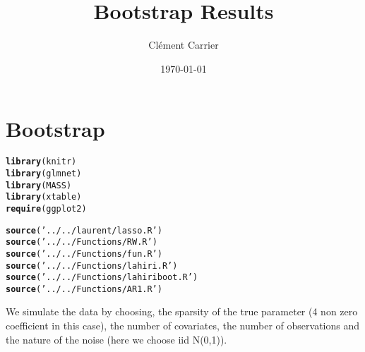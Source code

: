 \documentclass[11pt,oneside, a4paper]{amsart}\usepackage[]{graphicx}\usepackage[]{color}
\makeatletter
\newcommand{\hlstr}[1]{\textcolor[rgb]{0.192,0.494,0.8}{#1}}%
\newcommand{\hlstd}[1]{\textcolor[rgb]{0.345,0.345,0.345}{#1}}%
\newcommand{\hlkwd}[1]{\textcolor[rgb]{0.737,0.353,0.396}{\textbf{#1}}}%
\newenvironment{kframe}{%
 \def\at@end@of@kframe{}%
 \ifinner\ifhmode%
  \def\at@end@of@kframe{\end{minipage}}%
  \begin{minipage}{\columnwidth}%
 \fi\fi%
 \def\FrameCommand##1{\hskip\@totalleftmargin \hskip-\fboxsep
 \colorbox{shadecolor}{##1}\hskip-\fboxsep
     \hskip-\linewidth \hskip-\@totalleftmargin \hskip\columnwidth}%
 \MakeFramed {\advance\hsize-\width
   \@totalleftmargin\z@ \linewidth\hsize
   \@setminipage}}%
 {\par\unskip\endMakeFramed%
 \at@end@of@kframe}
\newenvironment{knitrout}{}{} %
\makeatother
\begin{document}
  
\title{Bootstrap Results}   
\author{Clément Carrier}
\date{\today}
\maketitle


\section*{Bootstrap}


\begin{knitrout}
\color{fgcolor}\begin{kframe}
\begin{alltt}
\hlkwd{library}\hlstd{(knitr)}
\hlkwd{library}\hlstd{(glmnet)}
\hlkwd{library}\hlstd{(MASS)}
\hlkwd{library}\hlstd{(xtable)}
\hlkwd{require}\hlstd{(ggplot2)}
\end{alltt}
\end{kframe}
\end{knitrout}




\begin{knitrout}
\color{fgcolor}\begin{kframe}
\begin{alltt}
\hlkwd{source}\hlstd{(}\hlstr{'../../laurent/lasso.R'}\hlstd{)}
\hlkwd{source}\hlstd{(}\hlstr{'../../Functions/RW.R'}\hlstd{)}
\hlkwd{source}\hlstd{(}\hlstr{'../../Functions/fun.R'}\hlstd{)}
\hlkwd{source}\hlstd{(}\hlstr{'../../Functions/lahiri.R'}\hlstd{)}
\hlkwd{source}\hlstd{(}\hlstr{'../../Functions/lahiriboot.R'}\hlstd{)}
\hlkwd{source}\hlstd{(}\hlstr{'../../Functions/AR1.R'}\hlstd{)}
\end{alltt}
\end{kframe}
\end{knitrout}


We simulate the data by choosing, the sparsity of the true parameter (4 non zero coefficient in this case), the number of covariates, the number of observations and the nature of the noise (here we choose iid N(0,1)). 
\end{document}
